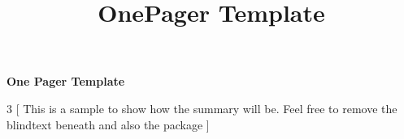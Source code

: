 \documentclass{article}
\title{OnePager Template}
\begin{document}
\begin{center}
      \Large{\textbf{One Pager Template}}
\end{center}

\small

\begin{multicols}{3}
[ %
This is a sample to show how the summary will be. Feel free to remove the blindtext beneath and also the package
]
\blindtext\blindtext \blindtext \blindtext \blindtext \blindtext  \blindtext \blindtext \blindtext 
\end{multicols}

\end{document}
